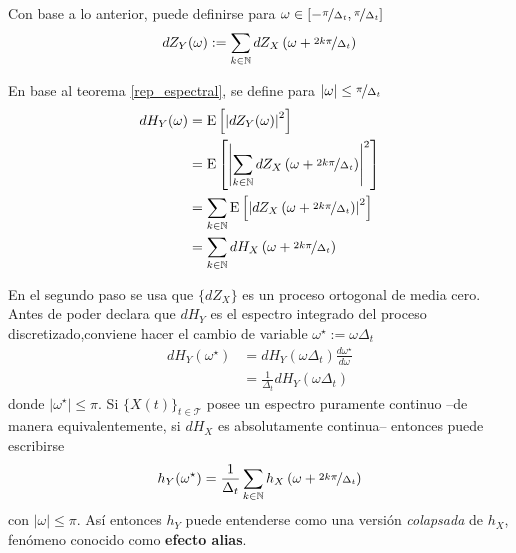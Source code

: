 \documentclass[12pt,letterpaper]{book}
\newcommand{\N}{\mathbb{N}}
\newcommand{\E}[1]{\mathrm{E}\left[ #1 \right]}
\newcommand{\abso}[1]{\left| #1 \right|}
\newcommand{\xt}{$\{X(t)\}_{t\in \mathcal{T}}$ }
\newcommand{\wdd}{\omega^{\star}}
\begin{document}
Con base a lo anterior, puede definirse para 
$\omega \in \left[ -\nicefrac{\pi}{\Delta_t} , \nicefrac{\pi}{\Delta_t} \right]$
\begin{equation}
dZ_Y(\omega) := \sum_{k \in \N} dZ_X\left( \omega + \nicefrac{2 k \pi}{\Delta_t}\right)
\end{equation}

En base al teorema \ref{rep_espectral}, se define para 
$\abso{\omega} \leq \nicefrac{\pi}{\Delta_t}$
\begin{align}
dH_Y(\omega) &= \E{\abso{dZ_Y(\omega)}^{2}} \nonumber \\
&= \E{\abso{\sum_{k \in \N} dZ_X\left( \omega + \nicefrac{2 k \pi}{\Delta_t}\right)}^{2}}
\nonumber \\
&= \sum_{k \in \N} \E{\abso{dZ_X\left( \omega + \nicefrac{2 k \pi}{\Delta_t}\right)}^{2}}
\nonumber \\
&= \sum_{k \in \N} dH_X\left( \omega + \nicefrac{2 k \pi}{\Delta_t}\right)
\end{align}

En el segundo paso se usa que $\{ dZ_X \}$ es un proceso ortogonal de media cero. Antes de poder declara que $dH_Y$ es el espectro integrado del proceso discretizado,conviene hacer el cambio de variable $\wdd := \omega \Delta_t$
\begin{align*}
dH_Y(\wdd) &= dH_Y(\omega \Delta_t) \frac{d\wdd}{d\omega} \\
&= \frac{1}{\Delta_t} dH_Y(\omega \Delta_t)
\end{align*}
donde $\abso{\wdd} \leq \pi$.
%
Si \xt posee un espectro puramente continuo --de manera equivalentemente, si $dH_X$ es absolutamente continua-- entonces puede escribirse
\begin{equation}
h_Y(\wdd) = \frac{1}{\Delta_t} \sum_{k \in \N} h_X\left( \omega + \nicefrac{2 k \pi}{\Delta_t}\right)
\end{equation}
con $\abso{\omega} \leq \pi$. 
%
Así entonces $h_Y$ puede entenderse como una versión \textit{colapsada} de $h_X$, fenómeno conocido como \textbf{efecto alias}.


\end{document}
